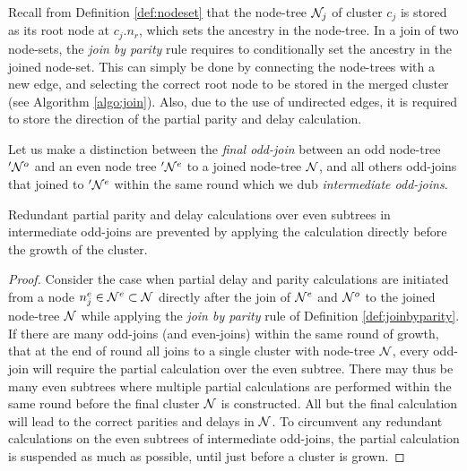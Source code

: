 Recall from Definition \ref{def:nodeset} that the node-tree $\mathcal{N}_j$ of cluster $c_j$ is stored as its root node at $c_j.n_r$, which sets the ancestry in the node-tree. In a join of two node-sets, the \emph{join by parity} rule requires to conditionally set the ancestry in the joined node-set. This can simply be done by connecting the node-trees with a new edge, and selecting the correct root node to be stored in the merged cluster (see Algorithm \ref{algo:join}). Also, due to the use of undirected edges, it is required to store the direction of the partial parity and delay calculation.

\begin{definition}
  Let us make a distinction between the \emph{final odd-join} between an odd node-tree $'\mathcal{N}^o$ and an even node tree $'\mathcal{N}^e$ to a joined node-tree $\mathcal{N}$, and all others odd-joins that joined to $'\mathcal{N}^e$ within the same round which we dub \emph{intermediate odd-joins}. 
\end{definition}

\begin{lemma}\label{lem:delaywhengrown}
  Redundant partial parity and delay calculations over even subtrees in intermediate odd-joins are prevented by applying the calculation directly before the growth of the cluster. 
\end{lemma}
\begin{proof}
  Consider the case when partial delay and parity calculations are initiated from a node $n_j^e \in \mathcal{N}^e \subset \mathcal{N}$ directly after the join of $\mathcal{N}^e$ and $\mathcal{N}^o$ to the joined node-tree $\mathcal{N}$ while applying the \emph{join by parity} rule of Definition \ref{def:joinbyparity}. If there are many odd-joins (and even-joins) within the same round of growth, that at the end of round all joins to a single cluster with node-tree $\mathcal{N}$, every odd-join will require the partial calculation over the even subtree. There may thus be many even subtrees where multiple partial calculations are performed within the same round before the final cluster $\mathcal{N}$ is constructed. All but the final calculation will lead to the correct parities and delays in $\mathcal{N}$. To circumvent any redundant calculations on the even subtrees of intermediate odd-joins, the partial calculation is suspended as much as possible, until just before a cluster is grown.
\end{proof}

